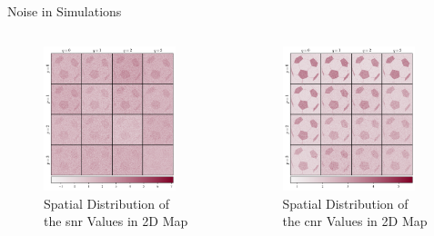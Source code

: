 \documentclass{beamer}
\begin{document}
\begin{frame}{Noise in Simulations}
\begin{columns}
\begin{figure}
\centering
\includegraphics[width=0.9\textwidth]{Images/snr2D_Spatial.png}
\caption{Spatial Distribution of the \gls{snr} Values in 2D Map}
\end{figure}

\begin{figure}
\centering
\includegraphics[width=0.9\textwidth]{Images/cnr2D_Spatial.png}
\caption{Spatial Distribution of the \gls{cnr} Values in 2D Map}
\end{figure}
\end{columns}
\end{frame}
\end{document}
